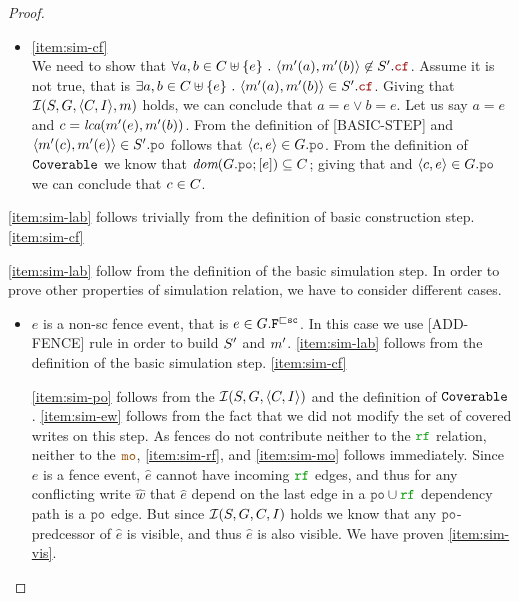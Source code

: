 \documentclass[12pt]{article}
\begin{document}
\begin{proof}
\begin{itemize}
  \item \ref{item:sim-cf} \\
    We need to show that
    $\forall{a, b \in \lC \uplus \{e\}} ~.~ \tup{\lM'(a), \lM'(b)} \not\in \lES'.\lCF$.
    Assume it is not true, that is
    $\exists{a, b \in \lC \uplus \{e\}} ~.~ \tup{\lM'(a), \lM'(b)} \in \lES'.\lCF$.
    Giving that $\mathcal{I}(S, G, \langle C, I \rangle, m)$ holds,
    we can conclude that $a = e \vee b = e$.
    Let us say $a = e$ and $c = \textit{lca}(m'(e), m'(b))$.
    From the definition of [BASIC-STEP] and 
    $\tup{\lM'(c), \lM'(e)} \in \lES'.\lPO$ follows that $\tup{c, e} \in \lG.\lPO$.
    From the definition of ${\mathtt{Coverable}}$ we know that $\dom{\lG.\lPO;[e]} \subseteq \lC$;
    giving that and $\tup{c, e} \in \lG.\lPO$ we can conclude that $c \in C$.
    
    
    
  \end{itemize}
  
  \ref{item:sim-lab} follows trivially from the definition of basic construction step.
  \ref{item:sim-cf} 
  
  
  \ref{item:sim-lab} follow from the definition of the basic simulation step.
  In order to prove other properties of simulation relation,
  we have to consider different cases.
  

  \begin{itemize}
  \item
    $e$ is a non-sc fence event, that is $e \in G.{\mathtt{F}}^{\sqsubset{\mathtt{sc}}}$.
    In this case we use [ADD-FENCE] rule in order to build $S'$ and $m'$.
    \ref{item:sim-lab} follows from the definition of the basic simulation step.
    \ref{item:sim-cf} 
    
      \ref{item:sim-po} follows from the $\mathcal{I}(S, G, \langle C, I \rangle)$ 
      and the definition of ${\mathtt{Coverable}}$.
      \ref{item:sim-ew} follows from the fact that
      we did not modify the set of covered writes on this step.
      As fences do not contribute neither to the $\lRF$ relation, neither to the $\lMO$, 
      \ref{item:sim-rf}, and \ref{item:sim-mo} follows immediately.
      Since $e$ is a fence event, $\hat{e}$ cannot have incoming $\lRF$ edges,
      and thus for any conflicting write $\hat{w}$ that $\hat{e}$ depend on
      the last edge in a $\lPO \cup \lRF$ dependency path is a $\lPO$ edge.
      But since $\mathcal{I}(S, G, C, I)$ holds we know that 
      any $\lPO$-predcessor of $\hat{e}$ is visible, and thus $\hat{e}$ is also visible.
      We have proven \ref{item:sim-vis}.


\end{itemize}
\end{proof}
\end{document}
